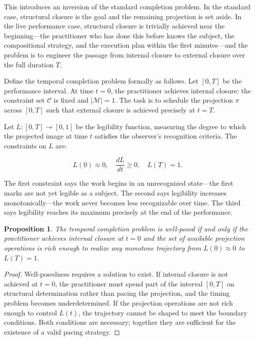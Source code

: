 \documentclass[12pt, twoside]{article}
\theoremstyle{plain}
\newtheorem{proposition}[theorem]{Proposition}
\theoremstyle{definition}
\theoremstyle{remark}
\begin{document}
This introduces an inversion of the standard completion problem. In the standard case, structural closure is the goal and the remaining projection is set aside. In the live performance case, structural closure is trivially achieved near the beginning---the practitioner who has done this before knows the subject, the compositional strategy, and the execution plan within the first minutes---and the problem is to engineer the passage from internal closure to external closure over the full duration $T$.

Define the temporal completion problem formally as follows. Let $[0, T]$ be the performance interval. At time $t = 0$, the practitioner achieves internal closure: the constraint set $\mathcal{C}$ is fixed and $|\mathcal{M}| = 1$. The task is to schedule the projection $\pi$ across $[0, T]$ such that external closure is achieved precisely at $t = T$.

Let $L : [0, T] \to [0, 1]$ be the legibility function, measuring the degree to which the projected image at time $t$ satisfies the observer's recognition criteria. The constraints on $L$ are:

\[
L(0) \approx 0, \quad \frac{dL}{dt} \geq 0, \quad L(T) = 1.
\]

The first constraint says the work begins in an unrecognized state---the first marks are not yet legible as a subject. The second says legibility increases monotonically---the work never becomes less recognizable over time. The third says legibility reaches its maximum precisely at the end of the performance.

\begin{proposition}
\label{prop:temporal-closure}
The temporal completion problem is well-posed if and only if the practitioner achieves internal closure at $t = 0$ and the set of available projection operations is rich enough to realize any monotone trajectory from $L(0) \approx 0$ to $L(T) = 1$.
\end{proposition}

\begin{proof}
Well-posedness requires a solution to exist. If internal closure is not achieved at $t = 0$, the practitioner must spend part of the interval $[0, T]$ on structural determination rather than pacing the projection, and the timing problem becomes underdetermined. If the projection operations are not rich enough to control $L(t)$, the trajectory cannot be shaped to meet the boundary conditions. Both conditions are necessary; together they are sufficient for the existence of a valid pacing strategy.
\end{proof}
\end{document}

